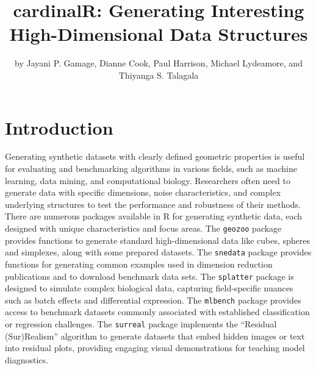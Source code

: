 \title{cardinalR: Generating Interesting High-Dimensional Data Structures}


\author{by Jayani P. Gamage, Dianne Cook, Paul Harrison, Michael Lydeamore, and Thiyanga S. Talagala}

\maketitle


\section{Introduction}\label{introduction}

Generating synthetic datasets with clearly defined geometric properties is useful for evaluating and benchmarking algorithms in various fields, such as machine learning, data mining, and computational biology. Researchers often need to generate data with specific dimensions, noise characteristics, and complex underlying structures to test the performance and robustness of their methods. There are numerous packages available in R for generating synthetic data, each designed with unique characteristics and focus areas. The \texttt{geozoo} package \citep{barret2016} provides functions to generate standard high-dimensional data like cubes, spheres and simplexes, along with some prepared datasets. The \texttt{snedata} package \citep{james2025} provides functions for generating common examples used in dimension reduction publications and to download benchmark data sets. The \texttt{splatter} package \citep{luke2017} is designed to simulate complex biological data, capturing field-specific nuances such as batch effects and differential expression. The \texttt{mlbench} package \citep{friedrich2024} provides access to benchmark datasets commonly associated with established classification or regression challenges. The \texttt{surreal} package \citep{james2024} implements the ``Residual (Sur)Realism'' algorithm \citep{leonard2007} to generate datasets that embed hidden images or text into residual plots, providing engaging visual demonstrations for teaching model diagnostics.

